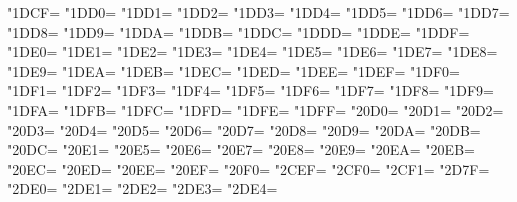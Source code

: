 \XeTeXcharclass"1DCF=\KclassCM
\XeTeXcharclass"1DD0=\KclassCM
\XeTeXcharclass"1DD1=\KclassCM
\XeTeXcharclass"1DD2=\KclassCM
\XeTeXcharclass"1DD3=\KclassCM
\XeTeXcharclass"1DD4=\KclassCM
\XeTeXcharclass"1DD5=\KclassCM
\XeTeXcharclass"1DD6=\KclassCM
\XeTeXcharclass"1DD7=\KclassCM
\XeTeXcharclass"1DD8=\KclassCM
\XeTeXcharclass"1DD9=\KclassCM
\XeTeXcharclass"1DDA=\KclassCM
\XeTeXcharclass"1DDB=\KclassCM
\XeTeXcharclass"1DDC=\KclassCM
\XeTeXcharclass"1DDD=\KclassCM
\XeTeXcharclass"1DDE=\KclassCM
\XeTeXcharclass"1DDF=\KclassCM
\XeTeXcharclass"1DE0=\KclassCM
\XeTeXcharclass"1DE1=\KclassCM
\XeTeXcharclass"1DE2=\KclassCM
\XeTeXcharclass"1DE3=\KclassCM
\XeTeXcharclass"1DE4=\KclassCM
\XeTeXcharclass"1DE5=\KclassCM
\XeTeXcharclass"1DE6=\KclassCM
\XeTeXcharclass"1DE7=\KclassCM
\XeTeXcharclass"1DE8=\KclassCM
\XeTeXcharclass"1DE9=\KclassCM
\XeTeXcharclass"1DEA=\KclassCM
\XeTeXcharclass"1DEB=\KclassCM
\XeTeXcharclass"1DEC=\KclassCM
\XeTeXcharclass"1DED=\KclassCM
\XeTeXcharclass"1DEE=\KclassCM
\XeTeXcharclass"1DEF=\KclassCM
\XeTeXcharclass"1DF0=\KclassCM
\XeTeXcharclass"1DF1=\KclassCM
\XeTeXcharclass"1DF2=\KclassCM
\XeTeXcharclass"1DF3=\KclassCM
\XeTeXcharclass"1DF4=\KclassCM
\XeTeXcharclass"1DF5=\KclassCM
\XeTeXcharclass"1DF6=\KclassCM
\XeTeXcharclass"1DF7=\KclassCM
\XeTeXcharclass"1DF8=\KclassCM
\XeTeXcharclass"1DF9=\KclassCM
\XeTeXcharclass"1DFA=\KclassCM
\XeTeXcharclass"1DFB=\KclassCM
\XeTeXcharclass"1DFC=\KclassCM
\XeTeXcharclass"1DFD=\KclassCM
\XeTeXcharclass"1DFE=\KclassCM
\XeTeXcharclass"1DFF=\KclassCM
\XeTeXcharclass"20D0=\KclassCM
\XeTeXcharclass"20D1=\KclassCM
\XeTeXcharclass"20D2=\KclassCM
\XeTeXcharclass"20D3=\KclassCM
\XeTeXcharclass"20D4=\KclassCM
\XeTeXcharclass"20D5=\KclassCM
\XeTeXcharclass"20D6=\KclassCM
\XeTeXcharclass"20D7=\KclassCM
\XeTeXcharclass"20D8=\KclassCM
\XeTeXcharclass"20D9=\KclassCM
\XeTeXcharclass"20DA=\KclassCM
\XeTeXcharclass"20DB=\KclassCM
\XeTeXcharclass"20DC=\KclassCM
\XeTeXcharclass"20E1=\KclassCM
\XeTeXcharclass"20E5=\KclassCM
\XeTeXcharclass"20E6=\KclassCM
\XeTeXcharclass"20E7=\KclassCM
\XeTeXcharclass"20E8=\KclassCM
\XeTeXcharclass"20E9=\KclassCM
\XeTeXcharclass"20EA=\KclassCM
\XeTeXcharclass"20EB=\KclassCM
\XeTeXcharclass"20EC=\KclassCM
\XeTeXcharclass"20ED=\KclassCM
\XeTeXcharclass"20EE=\KclassCM
\XeTeXcharclass"20EF=\KclassCM
\XeTeXcharclass"20F0=\KclassCM
\XeTeXcharclass"2CEF=\KclassCM
\XeTeXcharclass"2CF0=\KclassCM
\XeTeXcharclass"2CF1=\KclassCM
\XeTeXcharclass"2D7F=\KclassCM
\XeTeXcharclass"2DE0=\KclassCM
\XeTeXcharclass"2DE1=\KclassCM
\XeTeXcharclass"2DE2=\KclassCM
\XeTeXcharclass"2DE3=\KclassCM
\XeTeXcharclass"2DE4=\KclassCM
